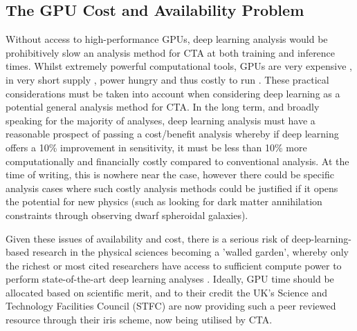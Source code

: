 \subsection{The GPU Cost and Availability Problem}
Without access to high-performance GPUs, deep learning analysis would be prohibitively slow an analysis method for CTA at both training and inference times. Whilst extremely powerful computational tools, GPUs are very expensive \cite{gpucost}, in very short supply \cite{gpushort}, power hungry \cite{2080ti} and thus costly to run \cite{2080ti}. These practical considerations must be taken into account when considering deep learning as a potential general analysis method for CTA. In the long term, and broadly speaking for the majority of analyses, deep learning analysis must have a reasonable prospect of passing a cost/benefit analysis whereby if deep learning offers a 10\% improvement in sensitivity, it must be less than 10\% more computationally and financially costly compared to conventional analysis. At the time of writing, this is nowhere near the case, however there could be specific analysis cases where such costly analysis methods could be justified if it opens the potential for new physics (such as looking for dark matter annihilation constraints through observing dwarf spheroidal galaxies\cite{gloryduck}).

Given these issues of availability and cost, there is a serious risk of deep-learning-based research in the physical sciences becoming a 'walled garden', whereby only the richest or most cited researchers have access to sufficient compute power to perform state-of-the-art deep learning analyses \cite{gpudivide}. Ideally, GPU time should be allocated based on scientific merit, and to their credit the UK's Science and Technology Facilities Council (STFC) are now providing such a peer reviewed resource through their iris scheme, now being utilised by CTA.